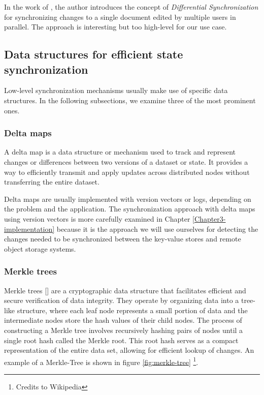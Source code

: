 In the work of \cite{fraser-diff-sync}, the author introduces the concept of \textit{Differential Synchronization} for synchronizing changes to a single document edited by multiple users in parallel. The approach is interesting but too high-level for our use case.

\subsection{Data structures for efficient state synchronization}
\label{data-structs-sync}

Low-level synchronization mechanisms usually make use of specific data structures. In the following subsections, we examine three of the most prominent ones.

\subsubsection{Delta maps}

A delta map is a data structure or mechanism used to track and represent changes or differences between two versions of a dataset or state. It provides a way to efficiently transmit and apply updates across distributed nodes without transferring the entire dataset.

Delta maps are usually implemented with version vectors or logs, depending on the problem and the application. The synchronization approach with delta maps using version vectors is more carefully examined in Chapter \ref{Chapter3-implementation} because it is the approach we will use ourselves for detecting the changes needed to be synchronized between the key-value stores and remote object storage systems.

\subsubsection{Merkle trees}

Merkle trees [\cite{merkle-trees}] are a cryptographic data structure that facilitates efficient and secure verification of data integrity. They operate by organizing data into a tree-like structure, where each leaf node represents a small portion of data and the intermediate nodes store the hash values of their child nodes. The process of constructing a Merkle tree involves recursively hashing pairs of nodes until a single root hash called the Merkle root. This root hash serves as a compact representation of the entire data set, allowing for efficient lookup of changes. An example of a Merkle-Tree is shown in figure \ref{fig:merkle-tree} \footnote{Credits to Wikipedia}.

